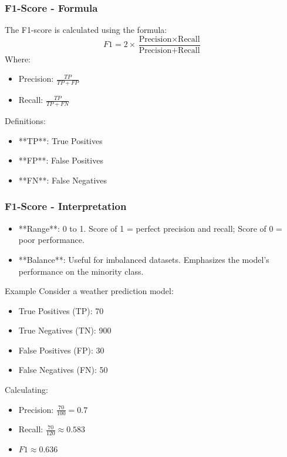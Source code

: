 \documentclass[aspectratio=169]{beamer}
\begin{document}
\begin{frame}[fragile]
    \frametitle{F1-Score - Formula}
    The F1-score is calculated using the formula:
    \begin{equation}
        F1 = 2 \times \frac{\text{Precision} \times \text{Recall}}{\text{Precision} + \text{Recall}} 
    \end{equation}
    Where:
    \begin{itemize}
        \item Precision: \( \frac{TP}{TP + FP} \)
        \item Recall: \( \frac{TP}{TP + FN} \)
    \end{itemize}
    Definitions:
    \begin{itemize}
        \item **TP**: True Positives
        \item **FP**: False Positives
        \item **FN**: False Negatives
    \end{itemize}
\end{frame}

\begin{frame}[fragile]
    \frametitle{F1-Score - Interpretation}
    \begin{itemize}
        \item **Range**: 0 to 1. Score of 1 = perfect precision and recall; Score of 0 = poor performance.
        \item **Balance**: Useful for imbalanced datasets. Emphasizes the model's performance on the minority class.
    \end{itemize}
    \begin{block}{Example}
        Consider a weather prediction model:
        \begin{itemize}
            \item True Positives (TP): 70
            \item True Negatives (TN): 900
            \item False Positives (FP): 30
            \item False Negatives (FN): 50
        \end{itemize}
        Calculating:
        \begin{itemize}
            \item Precision: \( \frac{70}{100} = 0.7 \)
            \item Recall: \( \frac{70}{120} \approx 0.583 \)
            \item \( F1 \approx 0.636 \)
        \end{itemize}
    \end{block}
\end{frame}
\end{document}
